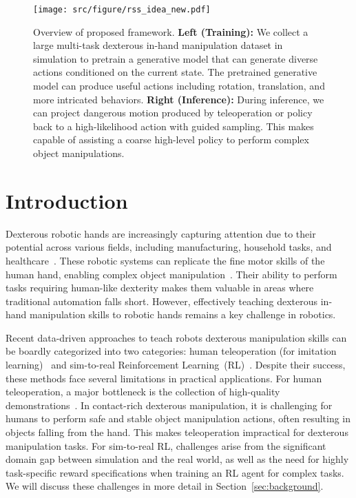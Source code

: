 \begin{figure*}
    \centering
    \texttt{[image: src/figure/rss\_idea\_new.pdf]}
    \caption{Overview of proposed framework. \textbf{Left (Training):} We collect a large multi-task dexterous in-hand manipulation dataset in simulation to pretrain a generative model that can generate diverse actions conditioned on the current state. The pretrained generative model can produce useful actions including rotation, translation, and more intricated behaviors.  \textbf{Right (Inference):} During inference, we can project dangerous motion produced by teleoperation or policy back to a high-likelihood action with guided sampling. This makes \mname{} capable of assisting a coarse high-level policy to perform complex object manipulations.}
    \label{fig:enter-label}
\end{figure*}


\section{Introduction}
Dexterous robotic hands are increasingly capturing attention due to their potential across various fields, including manufacturing, household tasks, and healthcare~\cite{okamura2000overview}. These robotic systems can replicate the fine motor skills of the human hand, enabling complex object manipulation~\cite{shaw2023leap, andrychowicz2020learning}. Their ability to perform tasks requiring human-like dexterity makes them valuable in areas where traditional automation falls short. However, effectively teaching dexterous in-hand manipulation skills to robotic hands remains a key challenge in robotics.

Recent data-driven approaches to teach robots dexterous manipulation skills can be boardly categorized into two categories: human teleoperation (for imitation learning)~\cite{hussein2017imitation, handa2020dexpilot,sivakumar2022robotic,qin2023anyteleop,ding2024bunny,lin2024learning,cheng2024open,wang2024dexcap,shaw2024bimanual} and sim-to-real Reinforcement Learning~(RL)~\cite{andrychowicz2020learning,handa2023dextreme,qi2023hand,yin2023rotating,khandate2023sampling,huang2023dynamic,chen2023sequential,kannan2023deft,agarwal2023dexterous,lum2024dextrah,yang2024anyrotate,wang2024lessons,lin2024twisting,sievers2022learning}. Despite their success, these methods face several limitations in practical applications. For human teleoperation, a major bottleneck is the collection of high-quality demonstrations~\cite{levine2020offline, yin2024offline}. In contact-rich dexterous manipulation, it is challenging for humans to perform safe and stable object manipulation actions, often resulting in objects falling from the hand. This makes teleoperation impractical for dexterous manipulation tasks. For sim-to-real RL, challenges arise from the significant domain gap between simulation and the real world, as well as the need for highly task-specific reward specifications when training an RL agent for complex tasks. We will discuss these challenges in more detail in Section~\ref{sec:background}.

